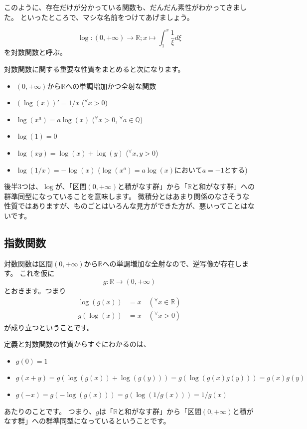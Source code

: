 このように、存在だけが分かっている関数も、だんだん素性がわかってきました。
といったところで、マシな名前をつけてあげましょう。
\begin{definition}[対数関数]
  \[
    \log:(0,+\infty)\to\mathbb{R};x\mapsto\int_1^x\frac1\xi d\xi
  \]
  を対数関数と呼ぶ。
\end{definition}

対数関数に関する重要な性質をまとめると次になります。
\begin{itemize}
  \item $(0,+\infty)$から$\mathbb{R}$への単調増加かつ全射な関数
  \item $(\log(x))'=1/x$ (${}^\forall x>0$)
  \item $\log(x^a)=a\log(x)$ (${}^\forall x>0$, ${}^\forall a\in\mathbb{Q}$)
  \item $\log(1)=0$
  \item $\log(xy)=\log(x)+\log(y)$ (${}^\forall x,y>0$)
  \item $\log(1/x)=-\log(x)$ ($\log(x^a)=a\log(x)$において$a=-1$とする)
\end{itemize}
後半3つは、$\log$が、「区間$(0,+\infty)$と積がなす群」から「$\mathbb{R}$と和がなす群」への群準同型になっていることを意味します。
微積分とはあまり関係のなさそうな性質ではありますが、ものごとはいろんな見方ができた方が、悪いってことはないです。

\subsection{指数関数}

対数関数は区間$(0,+\infty)$から$\mathbb{R}$への単調増加な全射なので、逆写像が存在します。
これを仮に
\[
  g:\mathbb{R}\to(0,+\infty)
\]
とおきます。つまり
\begin{align*}
  \log(g(x))&=x\quad({}^\forall x\in\mathbb{R})\\
  g(\log(x))&=x\quad({}^\forall x>0)
\end{align*}
が成り立つということです。

定義と対数関数の性質からすぐにわかるのは、
\begin{itemize}
  \item $g(0)=1$
  \item $g(x+y)=g(\log(g(x))+\log(g(y)))=g(\log(g(x)g(y)))=g(x)g(y)$
  \item $g(-x)=g(-\log(g(x)))=g(\log(1/g(x)))=1/g(x)$
\end{itemize}
あたりのことです。
つまり、$g$は「$\mathbb{R}$と和がなす群」から「区間$(0,+\infty)$と積がなす群」への群準同型になっているということです。

